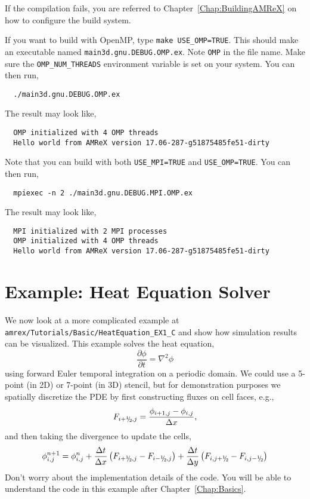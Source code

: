 If the compilation fails, you are referred to
Chapter~\ref{Chap:BuildingAMReX} on how to configure the build
system.

If you want to build with OpenMP, type {\tt make USE\_OMP=TRUE}.
This should make an executable named {\tt main3d.gnu.DEBUG.OMP.ex}.  Note
{\tt OMP} in the file name.  Make sure the {\tt OMP\_NUM\_THREADS}
environment variable is set on your system.  You can then run,
\begin{verbatim}
  ./main3d.gnu.DEBUG.OMP.ex
\end{verbatim}
The result may look like,
\begin{verbatim}
  OMP initialized with 4 OMP threads
  Hello world from AMReX version 17.06-287-g51875485fe51-dirty
\end{verbatim}
Note that you can build with both {\tt USE\_MPI=TRUE} and {\tt USE\_OMP=TRUE}.
You can then run,
\begin{verbatim}
  mpiexec -n 2 ./main3d.gnu.DEBUG.MPI.OMP.ex
\end{verbatim}
The result may look like,
\begin{verbatim}
  MPI initialized with 2 MPI processes
  OMP initialized with 4 OMP threads
  Hello world from AMReX version 17.06-287-g51875485fe51-dirty
\end{verbatim}

\section{Example: Heat Equation Solver}\label{sec:heat equation}

We now look at a more complicated example at
{\tt amrex/Tutorials/Basic/HeatEquation\_EX1\_C} and show how simulation
results can be visualized.  This example solves the heat equation,
\begin{equation}
\frac{\partial\phi}{\partial t} = \nabla^2\phi
\end{equation}
using forward Euler temporal integration on a periodic domain.  
We could use a 5-point (in 2D) or 7-point (in 3D) stencil, but for demonstration
purposes we spatially discretize the PDE by first constructing fluxes on cell faces, e.g.,
\begin{equation}
F_{i+\myhalf,j} = \frac{\phi_{i+1,j}-\phi_{i,j}}{\Delta x},
\end{equation}
and then taking the divergence to update the cells,
\begin{equation}
\phi_{i,j}^{n+1} = \phi_{i,j}^n 
+ \frac{\Delta t}{\Delta x}\left(F_{i+\myhalf,j}-F_{i-\myhalf,j}\right)
+ \frac{\Delta t}{\Delta y}\left(F_{i,j+\myhalf}-F_{i,j-\myhalf}\right)
\end{equation}
Don't worry about the implementation details of the code.
You will be able to understand the code in this example after
Chapter~\ref{Chap:Basics}. 


